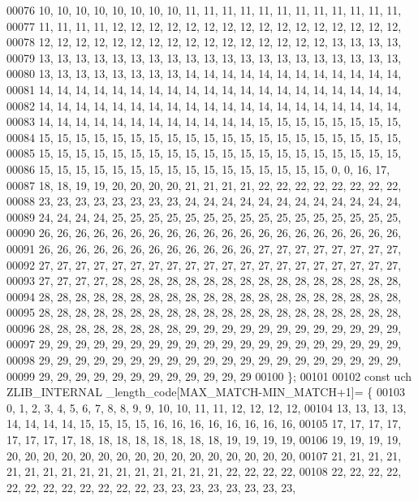 \begin{DoxyCode}
00076 10, 10, 10, 10, 10, 10, 10, 10, 11, 11, 11, 11, 11, 11, 11, 11, 11, 11, 11, 11,
00077 11, 11, 11, 11, 12, 12, 12, 12, 12, 12, 12, 12, 12, 12, 12, 12, 12, 12, 12, 12,
00078 12, 12, 12, 12, 12, 12, 12, 12, 12, 12, 12, 12, 12, 12, 12, 12, 13, 13, 13, 13,
00079 13, 13, 13, 13, 13, 13, 13, 13, 13, 13, 13, 13, 13, 13, 13, 13, 13, 13, 13, 13,
00080 13, 13, 13, 13, 13, 13, 13, 13, 14, 14, 14, 14, 14, 14, 14, 14, 14, 14, 14, 14,
00081 14, 14, 14, 14, 14, 14, 14, 14, 14, 14, 14, 14, 14, 14, 14, 14, 14, 14, 14, 14,
00082 14, 14, 14, 14, 14, 14, 14, 14, 14, 14, 14, 14, 14, 14, 14, 14, 14, 14, 14, 14,
00083 14, 14, 14, 14, 14, 14, 14, 14, 14, 14, 14, 14, 15, 15, 15, 15, 15, 15, 15, 15,
00084 15, 15, 15, 15, 15, 15, 15, 15, 15, 15, 15, 15, 15, 15, 15, 15, 15, 15, 15, 15,
00085 15, 15, 15, 15, 15, 15, 15, 15, 15, 15, 15, 15, 15, 15, 15, 15, 15, 15, 15, 15,
00086 15, 15, 15, 15, 15, 15, 15, 15, 15, 15, 15, 15, 15, 15, 15, 15,  0,  0, 16, 17,
00087 18, 18, 19, 19, 20, 20, 20, 20, 21, 21, 21, 21, 22, 22, 22, 22, 22, 22, 22, 22,
00088 23, 23, 23, 23, 23, 23, 23, 23, 24, 24, 24, 24, 24, 24, 24, 24, 24, 24, 24, 24,
00089 24, 24, 24, 24, 25, 25, 25, 25, 25, 25, 25, 25, 25, 25, 25, 25, 25, 25, 25, 25,
00090 26, 26, 26, 26, 26, 26, 26, 26, 26, 26, 26, 26, 26, 26, 26, 26, 26, 26, 26, 26,
00091 26, 26, 26, 26, 26, 26, 26, 26, 26, 26, 26, 26, 27, 27, 27, 27, 27, 27, 27, 27,
00092 27, 27, 27, 27, 27, 27, 27, 27, 27, 27, 27, 27, 27, 27, 27, 27, 27, 27, 27, 27,
00093 27, 27, 27, 27, 28, 28, 28, 28, 28, 28, 28, 28, 28, 28, 28, 28, 28, 28, 28, 28,
00094 28, 28, 28, 28, 28, 28, 28, 28, 28, 28, 28, 28, 28, 28, 28, 28, 28, 28, 28, 28,
00095 28, 28, 28, 28, 28, 28, 28, 28, 28, 28, 28, 28, 28, 28, 28, 28, 28, 28, 28, 28,
00096 28, 28, 28, 28, 28, 28, 28, 28, 29, 29, 29, 29, 29, 29, 29, 29, 29, 29, 29, 29,
00097 29, 29, 29, 29, 29, 29, 29, 29, 29, 29, 29, 29, 29, 29, 29, 29, 29, 29, 29, 29,
00098 29, 29, 29, 29, 29, 29, 29, 29, 29, 29, 29, 29, 29, 29, 29, 29, 29, 29, 29, 29,
00099 29, 29, 29, 29, 29, 29, 29, 29, 29, 29, 29, 29
00100 \};
00101 
00102 \textcolor{keyword}{const} uch ZLIB\_INTERNAL \_length\_code[MAX\_MATCH-MIN\_MATCH+1]= \{
00103  0,  1,  2,  3,  4,  5,  6,  7,  8,  8,  9,  9, 10, 10, 11, 11, 12, 12, 12, 12,
00104 13, 13, 13, 13, 14, 14, 14, 14, 15, 15, 15, 15, 16, 16, 16, 16, 16, 16, 16, 16,
00105 17, 17, 17, 17, 17, 17, 17, 17, 18, 18, 18, 18, 18, 18, 18, 18, 19, 19, 19, 19,
00106 19, 19, 19, 19, 20, 20, 20, 20, 20, 20, 20, 20, 20, 20, 20, 20, 20, 20, 20, 20,
00107 21, 21, 21, 21, 21, 21, 21, 21, 21, 21, 21, 21, 21, 21, 21, 21, 22, 22, 22, 22,
00108 22, 22, 22, 22, 22, 22, 22, 22, 22, 22, 22, 22, 23, 23, 23, 23, 23, 23, 23, 23,

\end{DoxyCode}
